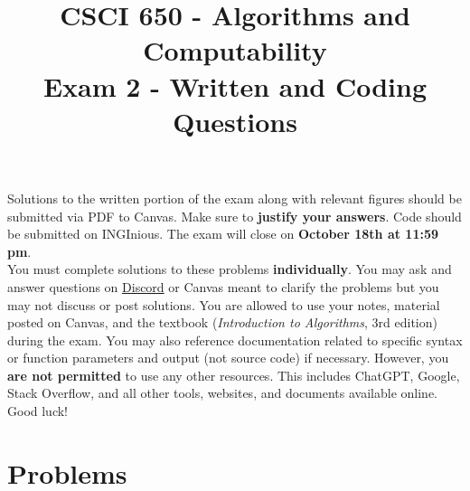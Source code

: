 \documentclass{article}
\title{CSCI 650 - Algorithms and Computability \\ Exam 2 - Written and Coding Questions}
\author{ }
\date{}
\begin{document}
\maketitle


\noindent Solutions to the written portion of the exam along with relevant figures should be submitted via PDF to Canvas. Make sure to \textbf{justify your answers}. Code should be submitted on INGInious. The exam will close on \textbf{October 18th at 11:59 pm}. \\ 

\noindent You must complete solutions to these problems \textbf{individually}. You may ask and answer questions on \href{https://discord.gg/xfBWWkbm2P}{Discord} or Canvas meant to clarify the problems but you may not discuss or post solutions. You are allowed to use your notes, material posted on Canvas, and the textbook (\textit{Introduction to Algorithms}, 3rd edition) during the exam. You may also reference documentation related to specific syntax or function parameters and output (not source code) if necessary. However, you \textbf{are not permitted} to use any other resources. This includes ChatGPT, Google, Stack Overflow, and all other tools, websites, and documents available online. \\

\noindent Good luck!\\

\section*{Problems}
\end{document}
